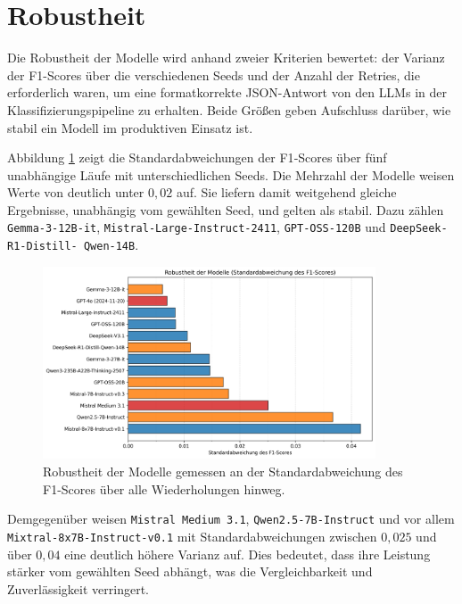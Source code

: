 \section{Robustheit}\label{sec:robustheit}

Die Robustheit der Modelle wird anhand zweier Kriterien bewertet: der Varianz der F1-Scores über die verschiedenen Seeds und der Anzahl der Retries, die erforderlich waren, um eine formatkorrekte JSON-Antwort von den \acp{LLM} in der Klassifizierungspipeline zu erhalten. Beide Größen geben Aufschluss darüber, wie stabil ein Modell im produktiven Einsatz ist.

Abbildung \ref{fig:results-evaluation-robustness-f1-std} zeigt die Standardabweichungen der F1‑Scores über fünf unabhängige Läufe mit unterschiedlichen Seeds. Die Mehrzahl der Modelle weisen Werte von deutlich unter $0{,}02$ auf. Sie liefern damit weitgehend gleiche Ergebnisse, unabhängig vom gewählten Seed, und gelten als stabil. Dazu zählen \texttt{Gemma-3-12B-it}, \texttt{Mistral-Large-Instruct-2411}, \texttt{GPT-OSS-120B} und \texttt{DeepSeek-R1-Distill-\linebreak~Qwen-14B}.

\begin{figure}[h]
    \centering
    \includegraphics[width=0.88\textwidth]{images/results/evaluation_robustness_f1_std}
    \caption{Robustheit der Modelle gemessen an der Standardabweichung des F1-Scores über alle Wiederholungen hinweg.}
    \label{fig:results-evaluation-robustness-f1-std}
\end{figure}

Demgegenüber weisen \texttt{Mistral Medium 3.1}, \texttt{Qwen2.5-7B-Instruct} und vor allem \texttt{Mixtral-8x7B-Instruct-v0.1} mit Standardabweichungen zwischen $0{,}025$ und über $0{,}04$ eine deutlich höhere Varianz auf. Dies bedeutet, dass ihre Leistung stärker vom gewählten Seed abhängt, was die Vergleichbarkeit und Zuverlässigkeit verringert.

